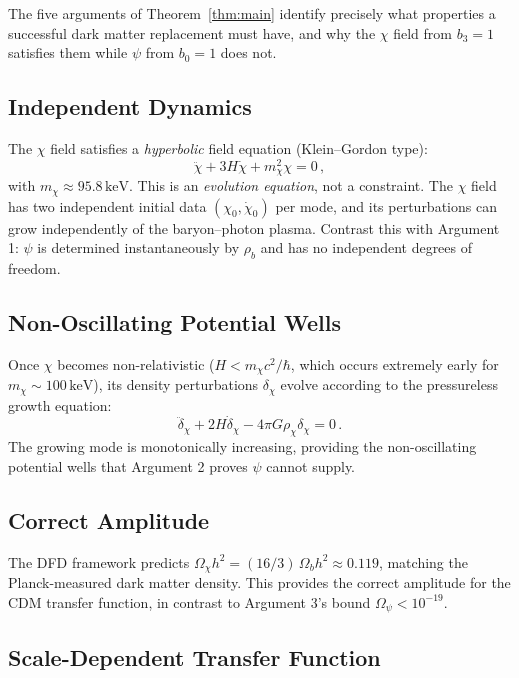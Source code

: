 \documentclass[12pt,a4paper]{article}
\newcommand{\keV}{\,\mathrm{keV}}
\begin{document}
The five arguments of Theorem~\ref{thm:main} identify precisely
what properties a successful dark matter replacement must have, and
why the $\chi$ field from $b_3 = 1$ satisfies them while $\psi$
from $b_0 = 1$ does not.

\subsection{Independent Dynamics}

The $\chi$ field satisfies a \emph{hyperbolic} field equation
(Klein--Gordon type):
\begin{equation}
\ddot{\chi} + 3H\dot{\chi} + m_\chi^2 \chi = 0\,,
\end{equation}
with $m_\chi \approx 95.8\keV$. This is an \emph{evolution equation},
not a constraint. The $\chi$ field has two independent initial data
$(\chi_0, \dot{\chi}_0)$ per mode, and its perturbations can grow
independently of the baryon--photon plasma. Contrast this with
Argument 1: $\psi$ is determined instantaneously by $\rho_b$ and
has no independent degrees of freedom.

\subsection{Non-Oscillating Potential Wells}

Once $\chi$ becomes non-relativistic ($H < m_\chi c^2/\hbar$, which
occurs extremely early for $m_\chi \sim 100\keV$), its density
perturbations $\delta_\chi$ evolve according to the pressureless
growth equation:
\begin{equation}
\ddot{\delta}_\chi + 2H\dot{\delta}_\chi - 4\pi G\rho_\chi\delta_\chi = 0\,.
\end{equation}
The growing mode is monotonically increasing, providing the
non-oscillating potential wells that Argument 2 proves $\psi$
cannot supply.

\subsection{Correct Amplitude}

The DFD framework predicts $\Omega_\chi h^2 = (16/3)\,\Omega_b h^2
\approx 0.119$, matching the Planck-measured dark matter density.
This provides the correct amplitude for the CDM transfer function,
in contrast to Argument 3's bound $\Omega_\psi < 10^{-19}$.

\subsection{Scale-Dependent Transfer Function}
\end{document}

